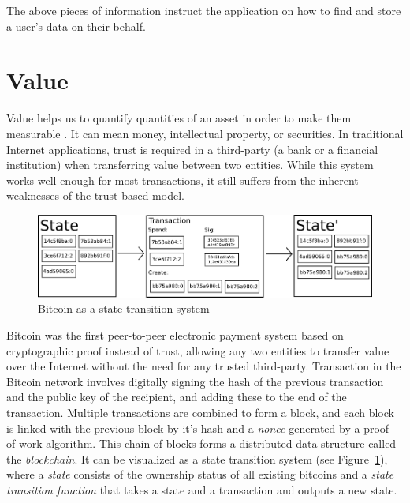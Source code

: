 		The above pieces of information instruct the application on how to find and store a user's data on their behalf.

\cleardoublepage
\section{Value}
	Value helps us to quantify quantities of an asset in order to make them measurable \cite{medium:iov:1}. It can mean money, intellectual property, or securities. In traditional Internet applications, trust is required in a third-party (a bank or a financial institution) when transferring value between two entities. While this system works well enough for most transactions, it still suffers from the inherent weaknesses of the trust-based model\cite{nakamoto2008bitcoin}.
	
	\begin{figure}[h]
		\includegraphics[width=\linewidth]{figures/state-transition}
		\caption{\label{fig:state-transition} Bitcoin as a state transition system\protect\footnotemark}
	\end{figure}
	
	Bitcoin\cite{nakamoto2008bitcoin} was the first peer-to-peer electronic payment system based on cryptographic proof instead of trust, allowing any two entities to transfer value over the Internet without the need for any trusted third-party. Transaction in the Bitcoin network involves digitally signing the hash of the previous transaction and the public key of the recipient, and adding these to the end of the transaction. Multiple transactions are combined to form a block, and each block is linked with the previous block by it's hash and a \textit{nonce} generated by a proof-of-work\cite{back2002hashcash} algorithm. This chain of blocks forms a distributed data structure called the \textit{blockchain}. It can be visualized as a state transition system (see Figure~\ref{fig:state-transition}), where a \textit{state} consists of the ownership status of all existing bitcoins and a \textit{state transition function} that takes a state and a transaction and outputs a new state\cite{buterin2014ethereum}.
	

